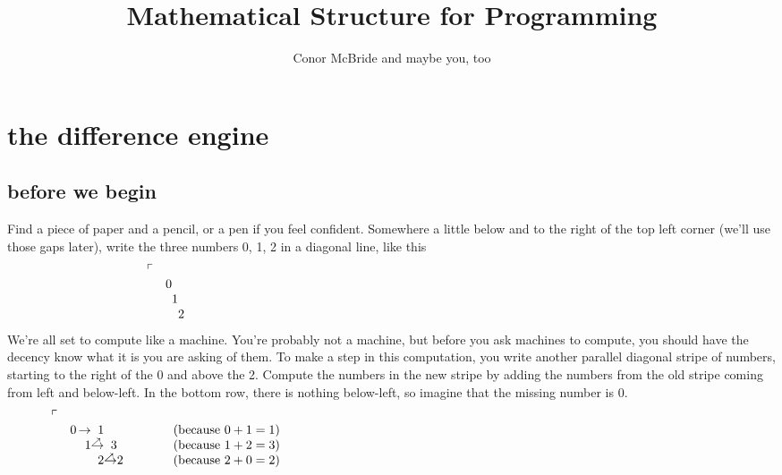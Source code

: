 \documentclass{book}
\makeatletter
\newcounter{spuddy}
\def\spudlemon{%
  \ifnum\c@spuddy=0{lemon}%
  \else{\addtocounter{spuddy}{-1}spud-\spudlemon}%
  \fi}
\renewcommand{\thepart}{\setcounter{spuddy}{\the\c@part}\spudlemon}
\makeatother
\begin{document}
\newtheorem{puz}{Puzzle}[chapter]
\newtheorem{askism}{Askism}[chapter]


\title{Mathematical Structure for Programming}
\author{Conor McBride and maybe you, too}
\maketitle

\setcounter{part}{-1}

\part{the difference engine}

\setcounter{chapter}{-1}

\chapter{before we begin}

Find a piece of paper and a pencil, or a pen if you feel confident. Somewhere a little below and to the right of the top left corner (we'll use those gaps later), write the three numbers 0, 1, 2 in a diagonal line, like this
\[\begin{array}{cc@{}c@{}c}
\ulcorner \\
&0 &   & \\
&  & 1 & \\
&  &   & 2
\end{array}
\hspace*{5in}\]
We're all set to compute like a machine. You're probably not a machine, but before you ask machines to compute, you should have the decency know what it is you are asking of them. To make a step in this computation, you write another parallel diagonal stripe of numbers, starting to the right of the 0 and above the 2. Compute the numbers in the new stripe by adding the numbers from the old stripe coming from left and below-left. In the bottom row, there is nothing below-left, so imagine that the missing number is 0.
\newcommand{\upri}{{}^\nearrow\hspace*{-0.15in}\rightarrow }
\[\begin{array}{lr@{}r@{}r@{}r@{}r@{\qquad\qquad}l}
\ulcorner&\\
& 0\, & \rightarrow & 1     &       &   & \mbox{(because $0+1=1$)}\\
&     & 1           & \upri & 3     &   & \mbox{(because $1+2=3$)}\\
&     &             & 2     & \upri & 2 & \mbox{(because $2+0=2$)}
\end{array}
\hspace*{5in}\]
\end{document}
